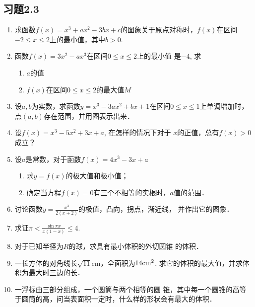 \subsection*{习题2.3}
\begin{enumerate}
    \item 求函数$f(x)=x^3+ax^2-3bx+c$的图象关于原点对称时，$f(x)$在区间$-2\le x\le 2$上的最小值，其中$b>0$.
    
    \item 函数$f(x)=3x^2-ax^3$在区间$0\le x\le 2$上的最小值
    是$-4$, 求
\begin{enumerate}
    \item $a$的值
    \item $f(x)$在区间$0\le x\le 2$的最大值$M$
\end{enumerate}
\item 设$a,b$为实数，求函数$y=x^3-3ax^2+bx+1$在区间$0\le x\le 1$上单调增加时，点$(a,b)$存在范围，并用图表示出来．

\item 设$f(x)=x^3-5x^2+3x+a$, 在怎样的情况下对于
$x$的正值，总有$f(x)>0$成立？
\item 设$a$是常数，对于函数$f(x)=4x^3-3x+a$
\begin{enumerate}
    \item 求$y=f(x)$的极大值和极小值；
    \item 确定当方程$f(x)=0$有三个不相等的实根时，$a$值的范围．
\end{enumerate}

\item 讨论函数$y=\frac{x^3}{2 (x+2)}$的极值，凸向，拐点，渐近线，
并作出它的图象．

\item 求证$\pi<\frac{\sin\pi x}{x(1-x)}\le 4$.
\item 对于已知半径为$R$的球，求具有最小体积的外切圆锥
的体积．
\item 一长方体的对角线长$\sqrt{11}$cm，全面积为$14{\rm cm}^2$, 求它的体积的最大值，并求体积为最大时三边的长．
\item 一浮标由三部分组成，一个圆筒与两个相等的圆
锥，其中每一个圆锥的高等于圆筒的高，问当表面积一定时，什么样的形状会有最大的体积．
\end{enumerate}     


